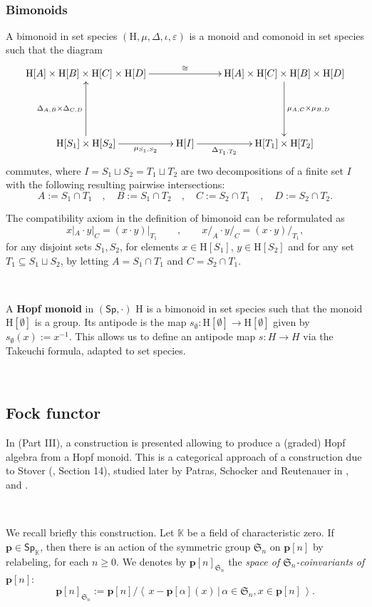 \documentclass[12pt, reqno]{amsart}
\theoremstyle{definition}
\newcommand{\Ss}{\mathsf{Sp}} %
\newcommand{\Ssk}{\mathsf{Sp}_\Kb} %
\newcommand{\Kb}{\mathbb{K}}
\newcommand{\rH}{\mathrm{H}}
\newcommand{\tp}{\mathbf{p}}
\begin{document}
\

\subsubsection{Bimonoids}
A bimonoid in set species $(\rH, \mu, \Delta, \iota, \varepsilon)$ is a monoid and comonoid in set species such that the diagram
\[\xymatrix{
\rH[A] \times \rH[B] \times\rH[C] \times \rH[D] \ar[rr]^-{\cong} && \rH[A] \times \rH[C] \times \rH[B] \times \rH[D] \ar[dd]^-{\mu_{A,C}\times\mu_{B,D}}\\
&&\\
\rH[S_1]\times \rH[S_2]\ar[uu]^-{\Delta_{A,B}\times \Delta_{C,D}} \ar[r]_-{\mu_{S_1, S_2}} & \rH[I] \ar[r]_-{\Delta_{T_1, T_2}} & \rH[T_1]\times \rH[T_2]
}\]
commutes, where $I=S_1\sqcup S_2=T_1 \sqcup T_2$ are two decompositions of a finite set $I$ with the following resulting pairwise intersections:
\[A:=S_1\cap T_1 \quad , \quad B:=S_1 \cap T_2 \quad , \quad C:=S_2 \cap T_1 \quad , \quad D:=S_2 \cap T_2.\]

The compatibility axiom in the definition of bimonoid can be reformulated as
\[x|_A \cdot y|_C= (x\cdot y)|_{T_1} \qquad , \qquad x/_A \cdot y/_C=(x \cdot y)/_{T_1},\]
for any disjoint sets $S_1, S_2$, for elements $x \in \rH[S_1]$, $y\in \rH[S_2]$ and for any set $T_1\subseteq S_1 \sqcup S_2$, by letting $A= S_1 \cap T_1$ and $C= S_2\cap T_1$.

\

A {\bf Hopf monoid} in $(\Ss, \cdot)$ $\rH$ is a bimonoid in set species such that the monoid $\rH[\emptyset]$ is a group. Its antipode is the map $s_\emptyset: \rH[\emptyset]\to \rH[\emptyset]$ given by $s_\emptyset(x):=x^{-1}$.
This allows us to define an antipode map $s: H\to H$ via the Takeuchi formula, adapted to set species.


\

\subsection{Fock functor}
In \cite{AM2010} (Part III), a construction is presented allowing to produce a (graded) Hopf algebra from a Hopf monoid. This is a categorical approach of a construction due to Stover (\cite{Stover}, Section 14), studied later by Patras, Schocker and Reutenauer in \cite{PR2004}, \cite{PS2006} and \cite{PS2008}.

\

We recall briefly this construction. Let $\mathbb{K}$ be a field of characteristic zero. If $\tp \in \Ssk$, then there is an action of the symmetric group $\mathfrak{S}_n$ on $\tp[n]$ by relabeling, for each $n \geq 0$. We denotes by $\tp[n]_{\mathfrak{S}_n}$ the \emph{space of $\mathfrak{S}_n$-coinvariants of $\tp[n]$}:
\begin{equation}
  \tp[n]_{\mathfrak{S}_n}:=\tp[n]/\left\langle \, x- \tp[\alpha](x) \, | \, \alpha \in \mathfrak{S}_n, x\in \tp[n] \,\right\rangle.
\end{equation}
\end{document}
